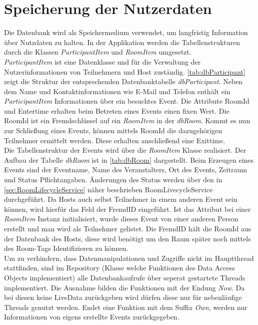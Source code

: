\section{Speicherung der Nutzerdaten}
\label{sec:Datenbank}
Die Datenbank wird als Speichermedium verwendet, um langfristig Information über Nutzdaten zu halten. 
In der Applikation werden die Tabellenstrukturen durch die Klassen \textit{ParticipantItem} und \textit{RoomItem} umgesetzt. \\
\textit{ParticipantItem} ist eine Datenklasse und für die Verwaltung der Nutzerinformationen von Teilnehmern und Host zuständig.
\cref{tab:dbParticipant} zeigt die Struktur der entsprechenden Datenbanktabelle \textit{dbParticipant}. 
Neben dem Name und Kontaktinformationen wie E-Mail und Telefon enthält ein \textit{ParticipantItem} Informationen über ein besuchtes Event. 
Die Attribute RoomId und Entertime erhalten beim Betreten eines Events einen fixen Wert. 
Die RoomId ist ein Fremdschlüssel auf ein \textit{RoomItem} in der \textit{dbRoom}.
Kommt es nun zur Schließung eines Events, können mittels RoomId die dazugehörigen Teilnehmer ermittelt werden. 
Diese erhalten anschließend eine Exittime.\\
Die Tabellenstruktur der Events wird über die \textit{RoomItem} Klasse realisiert. Der Aufbau der Tabelle \textit{dbRoom} ist in \cref{tab:dbRoom} dargestellt. 
Beim Erzeugen eines Events sind der Eventname, Name des Veranstalters, Ort des Events, Zeitraum und Status Pflichtangaben.
Änderungen des Status werden über den in \cref{sec:RoomLifecycleService} näher beschrieben RoomLivecycleService durchgeführt.
Da Hosts auch selbst Teilnehmer in einem anderen Event sein können, wird hierfür das Feld der FremdID eingeführt.
Ist das Attribut bei einer \textit{RoomItem} Instanz initialisiert, wurde dieses Event von einer anderen Person erstellt und man wird als Teilnehmer gelistet. 
Die FremdID hält die RoomId aus der Datenbank des Hosts, diese wird benötigt um den Raum später noch mittels des Room-Tags Identifizieren zu können.   \\
Um zu verhindern, dass Datenmanipulationen und Zugriffe nicht im Hauptthread stattfinden, sind im Repository (Klasse welche Funktionen des Data Access Objects implementiert) alle Datenbankaufrufe über seperat gestartete Threads implementiert.
Die Ausnahme bilden die Funktionen mit der Endung \textit{Now}. 
Da bei diesen keine LiveData zurückgeben wird dürfen diese nur für nebenläufige Threads genutzt werden. 
Endet eine Funktion mit dem Suffix \textit{Own}, werden nur  Informationen von eigens erstellte Events zurückgegeben.
